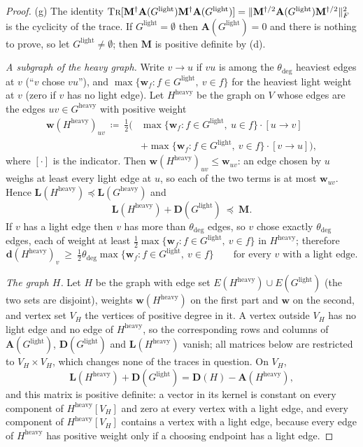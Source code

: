 \documentclass[11pt]{article}
\theoremstyle{remark}
\renewcommand{\AA}{\mathbf A}
\newcommand{\dd}{\mathbf d}
\newcommand{\DD}{\mathbf D}
\newcommand{\LL}{\mathbf L}
\newcommand{\MM}{\mathbf M}
\newcommand{\ww}{\mathbf w}
\newcommand{\dheavy}{\theta_{\deg}}
\newcommand{\Gh}{G^{\mathrm{heavy}}}
\newcommand{\Gl}{G^{\mathrm{light}}}
\newcommand{\defeq}{\coloneqq}
\newcommand{\norm}[1]{\lVert#1\rVert}
\newcommand{\tr}{\textsc{Tr}}
\begin{document}
\begin{proof}
(g) The identity
$\tr[\MM^{\dag}\AA(\Gl)\MM^{\dag}\AA(\Gl)]=\norm{\MM^{\dag/2}\AA(\Gl)\MM^{\dag/2}}_F^{2}$
is the cyclicity of the trace.
If $\Gl=\emptyset$ then $\AA(\Gl)=0$ and there is nothing to prove, so let
$\Gl\neq\emptyset$; then $\MM$ is positive definite by (d).

\emph{A subgraph of the heavy graph.}
Write $v\to u$ if $vu$ is among the $\dheavy$ heaviest edges at $v$ (``$v$
chose $vu$''), and $\max\{\ww_f:f\in\Gl,\ v\in f\}$ for the heaviest light
weight at $v$ (zero if $v$ has no light edge).
Let $H^{\mathrm{heavy}}$ be the graph on $V$ whose edges are the edges
$uv\in\Gh$ with positive weight
\begin{align*}
\ww(H^{\mathrm{heavy}})_{uv}\ \defeq\ \tfrac12\bigl(
&\max\{\ww_f:f\in\Gl,\ u\in f\}\cdot[u\to v]\\
&+\max\{\ww_f:f\in\Gl,\ v\in f\}\cdot[v\to u]\bigr),
\end{align*}
where $[\cdot]$ is the indicator.
Then $\ww(H^{\mathrm{heavy}})_{uv}\le\ww_{uv}$: an edge chosen by $u$ weighs
at least every light edge at $u$, so each of the two terms is at most
$\ww_{uv}$.
Hence $\LL(H^{\mathrm{heavy}})\preceq\LL(\Gh)$ and
\[
\LL(H^{\mathrm{heavy}})+\DD(\Gl)\ \preceq\ \MM .
\]
If $v$ has a light edge then $v$ has more than $\dheavy$ edges, so $v$ chose
exactly $\dheavy$ edges, each of weight at least
$\frac12\max\{\ww_f:f\in\Gl,\ v\in f\}$ in $H^{\mathrm{heavy}}$; therefore
\begin{equation}\label{eq:halfdeg}
\dd(H^{\mathrm{heavy}})_v\ \ge\ \tfrac12\dheavy\max\{\ww_f:f\in\Gl,\ v\in f\}
\qquad\text{for every $v$ with a light edge.}
\end{equation}

\emph{The graph $H$.}
Let $H$ be the graph with edge set $E(H^{\mathrm{heavy}})\cup E(\Gl)$ (the two
sets are disjoint), weights $\ww(H^{\mathrm{heavy}})$ on the first part and
$\ww$ on the second, and vertex set $V_H$ the vertices of positive degree in
it.
A vertex outside $V_H$ has no light edge and no edge of $H^{\mathrm{heavy}}$,
so the corresponding rows and columns of $\AA(\Gl)$, $\DD(\Gl)$ and
$\LL(H^{\mathrm{heavy}})$ vanish; all matrices below are restricted to
$V_H\times V_H$, which changes none of the traces in question.
On $V_H$,
\[
\LL(H^{\mathrm{heavy}})+\DD(\Gl)=\DD(H)-\AA(H^{\mathrm{heavy}}),
\]
and this matrix is positive definite: a vector in its kernel is constant
on every component of $H^{\mathrm{heavy}}[V_H]$ and zero at every vertex
with a light edge, and every component of $H^{\mathrm{heavy}}[V_H]$ contains
a vertex with a light edge, because every edge of $H^{\mathrm{heavy}}$ has
positive weight only if a choosing endpoint has a light edge.


\end{proof}
\end{document}
